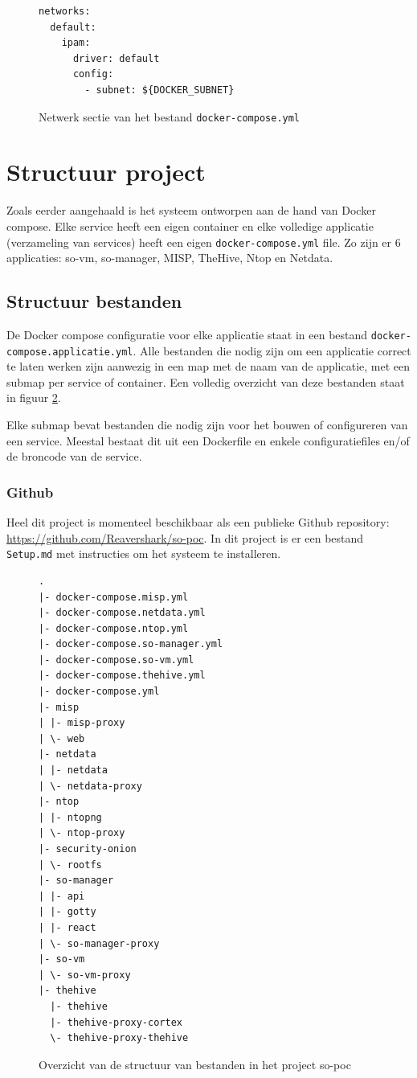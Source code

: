 \documentclass[a4paper,12pt]{report}
\begin{document}
\begin{figure}[H]
  \begin{lstlisting}
networks:
  default:
    ipam:
      driver: default
      config:
        - subnet: ${DOCKER_SUBNET}
  \end{lstlisting}
  \caption{Netwerk sectie van het bestand \lstinline|docker-compose.yml|}
  \label{fig:docker-compose-network}
\end{figure}

\section{Structuur project}
Zoals eerder aangehaald is het systeem ontworpen aan de hand van Docker compose.
Elke service heeft een eigen container en elke volledige applicatie (verzameling van services) heeft een eigen \lstinline|docker-compose.yml| file.
Zo zijn er 6 applicaties: so-vm, so-manager, MISP, TheHive, Ntop en Netdata.

\subsection{Structuur bestanden}
De Docker compose configuratie voor elke applicatie staat in een bestand \lstinline|docker-compose.applicatie.yml|.
Alle bestanden die nodig zijn om een applicatie correct te laten werken zijn aanwezig in een map met de naam van de applicatie, met een submap per service of container.
Een volledig overzicht van deze bestanden staat in figuur \ref{fig:so-poc-structuur-docker-compose-containers}.

Elke submap bevat bestanden die nodig zijn voor het bouwen of configureren van een service.
Meestal bestaat dit uit een Dockerfile en enkele configuratiefiles en/of de broncode van de service.

\subsubsection{Github}
Heel dit project is momenteel beschikbaar als een publieke Github repository: \url{https://github.com/Reavershark/so-poc}.
In dit project is er een bestand \lstinline|Setup.md| met instructies om het systeem te installeren.

\begin{figure}[H]
  \begin{lstlisting}
.
|- docker-compose.misp.yml
|- docker-compose.netdata.yml
|- docker-compose.ntop.yml
|- docker-compose.so-manager.yml
|- docker-compose.so-vm.yml
|- docker-compose.thehive.yml
|- docker-compose.yml
|- misp
| |- misp-proxy
| \- web
|- netdata
| |- netdata
| \- netdata-proxy
|- ntop
| |- ntopng
| \- ntop-proxy
|- security-onion
| \- rootfs
|- so-manager
| |- api
| |- gotty
| |- react
| \- so-manager-proxy
|- so-vm
| \- so-vm-proxy
|- thehive
  |- thehive
  |- thehive-proxy-cortex
  \- thehive-proxy-thehive
  \end{lstlisting}
  \caption{Overzicht van de structuur van bestanden in het project so-poc}
  \label{fig:so-poc-structuur-docker-compose-containers}
\end{figure}
\end{document}
